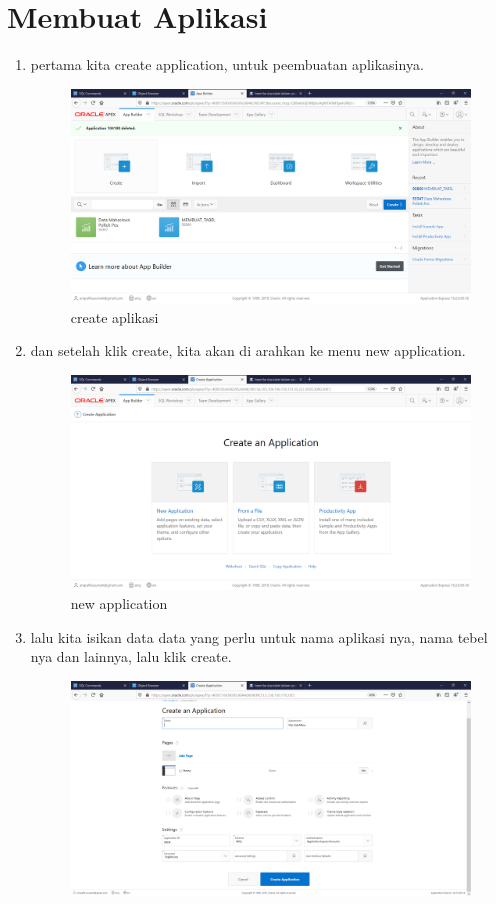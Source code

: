 \documentclass[12pt, a4paper]{report}
\begin{document}
\section{Membuat Aplikasi}
\begin{enumerate}
	\item pertama kita create application, untuk peembuatan aplikasinya.
	\begin{figure}[h]
		\centering
		\includegraphics[scale=0.3]{figures/2.png}
		\caption{create aplikasi}
	\end{figure}
	\item dan setelah klik create, kita akan di arahkan ke menu new application.
	\begin{figure}[h]
		\centering
		\includegraphics[scale=0.3]{figures/3.png}
		\caption{new application}
	\end{figure}
	\item lalu kita isikan data data yang perlu untuk nama aplikasi nya, nama tebel nya dan lainnya, lalu klik create.
	\begin{figure}[h]
		\centering
		\includegraphics[scale=0.3]{figures/4.png}

\end{figure}
\end{enumerate}
\end{document}
